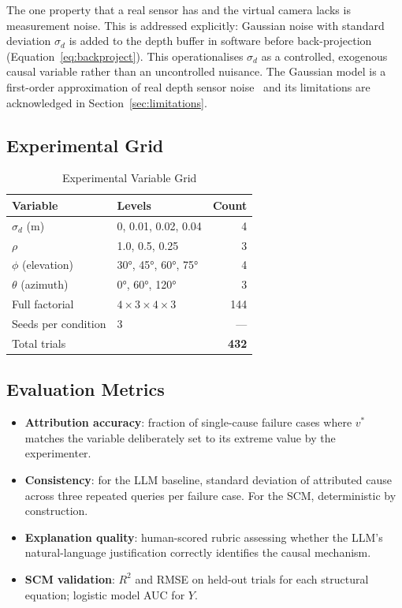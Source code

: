 \documentclass[journal]{IEEEtran}
\begin{document}
The one property that a real sensor has and the virtual camera lacks is
measurement noise.  This is addressed explicitly: Gaussian noise with
standard deviation $\sigma_d$ is added to the depth buffer in software
before back-projection (Equation~\ref{eq:backproject}).  This operationalises
$\sigma_d$ as a controlled, exogenous causal variable rather than an
uncontrolled nuisance.  The Gaussian model is a first-order approximation of
real depth sensor noise~\cite{khoshelham2012accuracy, nguyen2012kinect} and
its limitations are acknowledged in Section~\ref{sec:limitations}.

\subsection{Experimental Grid}

\begin{table}[t]
  \caption{Experimental Variable Grid}
  \label{tab:grid}
  \centering
  \begin{tabular}{llr}
    \toprule
    \textbf{Variable} & \textbf{Levels} & \textbf{Count} \\
    \midrule
    $\sigma_d$ (m)      & 0, 0.01, 0.02, 0.04 & 4 \\
    $\rho$              & 1.0, 0.5, 0.25      & 3 \\
    $\phi$ (elevation)  & 30°, 45°, 60°, 75°  & 4 \\
    $\theta$ (azimuth)  & 0°, 60°, 120°       & 3 \\
    \midrule
    Full factorial      & $4{\times}3{\times}4{\times}3$ & 144 \\
    Seeds per condition & 3 & --- \\
    Total trials        & & \textbf{432} \\
    \bottomrule
  \end{tabular}
\end{table}

\subsection{Evaluation Metrics}

\begin{itemize}
  \item \textbf{Attribution accuracy}: fraction of single-cause
        failure cases where $v^*$ matches the variable deliberately
        set to its extreme value by the experimenter.
  \item \textbf{Consistency}: for the LLM baseline, standard
        deviation of attributed cause across three repeated queries
        per failure case.  For the SCM, deterministic by construction.
  \item \textbf{Explanation quality}: human-scored rubric assessing
        whether the LLM's natural-language justification correctly
        identifies the causal mechanism.
  \item \textbf{SCM validation}: $R^2$ and RMSE on held-out trials
        for each structural equation; logistic model AUC for $Y$.
\end{itemize}
\end{document}
